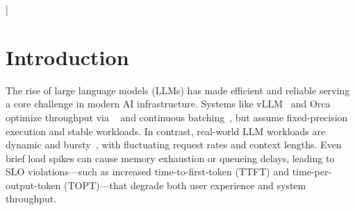 \documentclass{article}
\newcommand{\system}{{MorphServe}\xspace}
\newcommand{\PagedAttention}{\text{PagedAttention}\xspace}
\begin{document}
\begin{abstract}
Efficiently serving large language models (LLMs) under dynamic and bursty workloads remains a key challenge for real-world deployment. Existing serving frameworks and static model compression techniques fail to adapt to workload fluctuations, leading to either service-level objective (SLO) violations under full-precision serving or persistent accuracy degradation with static quantization. To deal with these issues, we present {\system}, a dynamic, workload-aware LLM serving framework based on \emph{morphological adaptation}. {\system} introduces two asynchronous, token-level runtime mechanisms: \emph{quantized layer swapping}, which selectively replaces less impactful layers with quantized alternatives during high-load periods, and \emph{pressure-aware KV cache resizing}, which dynamically adjusts KV cache capacity in response to memory pressure. These mechanisms enable state-preserving transitions with minimum runtime overhead and are fully compatible with modern scheduling and attention techniques. Extensive experiments on Vicuna and Llama family models with real-world workloads demonstrate that {\system} reduces average SLO violations by 92.45\% and improves the P95 TTFT latency by $2.2$-\emph{$3.9\times$} compared to full-precision serving, without compromising generation quality. These results establish {\system} as a practical and elastic solution for LLM deployment in dynamic environments. 
\end{abstract}
]

\printAffiliationsAndNotice{}  %

% 

\section{Introduction}
\label{sec:intro}

The rise of large language models (LLMs) has made efficient and reliable serving a core challenge in modern AI infrastructure. Systems like vLLM~\cite{kwon2023efficient_vllm} and Orca~\cite{yu2022orca} optimize throughput via {\PagedAttention}~\cite{kwon2023efficient_vllm} and continuous batching~\cite{yu2022orca, sun2024llumnix, he2024deferred_llm_batching}, but assume fixed-precision execution and stable workloads. In contrast, real-world LLM workloads are dynamic and bursty~\cite{wang2024burstgpt, patel2024splitwise, azure_LLM_inference_trace}, with fluctuating request rates and context lengths. Even brief load spikes can cause memory exhaustion or queueing delays, leading to SLO violations---such as increased time-to-first-token (TTFT) and time-per-output-token (TOPT)---that degrade both user experience and system throughput. 
\end{document}
